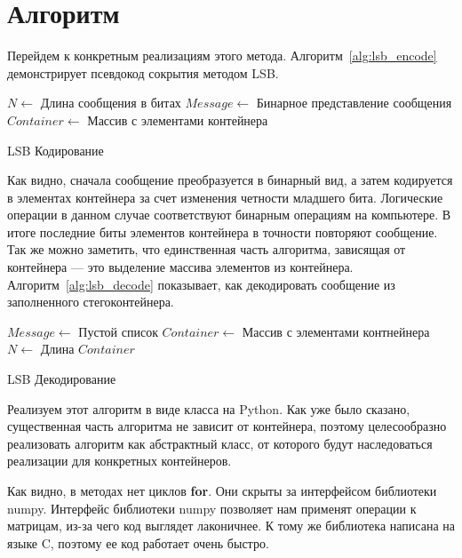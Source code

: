 \section{Алгоритм}
Перейдем к конкретным реализациям этого метода. Алгоритм~\ref{alg:lsb_encode}
демонстрирует псевдокод сокрытия методом LSB.
\begin{algorithm}[ht!]
     $N \leftarrow$ Длина сообщения в битах\;
     $Message \leftarrow$ Бинарное представление сообщения\;
     $Container \leftarrow$ Массив с элементами контейнера\;
     \caption{LSB Кодирование}
    \label{alg:lsb_encode}
\end{algorithm}
Как видно, сначала сообщение преобразуется в бинарный вид,
а затем кодируется в элементах контейнера за счет изменения четности младшего бита.
Логические операции в данном случае соответствуют бинарным операциям на компьютере.
В итоге последние биты элементов контейнера в точности повторяют сообщение.
Так же можно заметить, что единственная часть алгоритма, зависящая от контейнера
--- это выделение массива элементов из контейнера. Алгоритм~\ref{alg:lsb_decode}
показывает, как декодировать сообщение из заполненного стегоконтейнера.
\begin{algorithm}[ht!]
    $Message \leftarrow$ Пустой список\;
    $Container \leftarrow$ Массив с элементами контнейнера\;
    $N \leftarrow$ Длина $Container$\;
    \caption{LSB Декодирование}
    \label{alg:lsb_decode}
\end{algorithm}

Реализуем этот алгоритм в виде класса на Python. Как уже было сказано,
существенная часть алгоритма не зависит от контейнера,
поэтому целесообразно реализовать алгоритм как абстрактный класс,
от которого будут наследоваться реализации для конкретных контейнеров.


Как видно, в методах нет циклов \textbf{for}. Они скрыты за интерфейсом библиотеки numpy.
Интерфейс библиотеки numpy позволяет нам применят операции к матрицам,
из-за чего код выглядет лаконичнее. К тому же библиотека написана на языке C,
поэтому ее код работает очень быстро.

